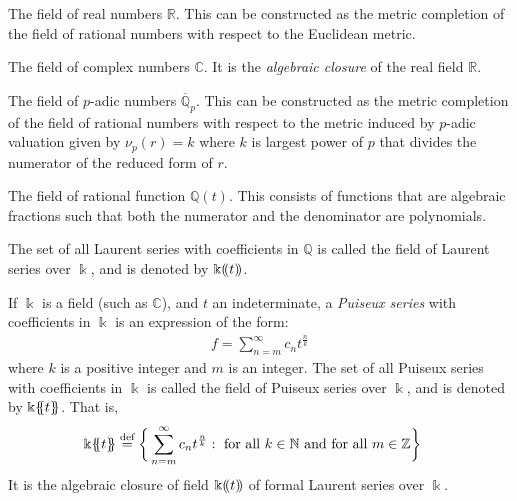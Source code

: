 \documentclass[a4paper, 12pt]{book} %
\begin{document}
\begin{example}
The field of real numbers $\mathbb{R}$. This can be constructed as the metric completion of the field of rational numbers with respect to the Euclidean metric.
\end{example}

\begin{example}
The field of complex numbers $\mathbb{C}$. It is the \emph{algebraic closure} of the real field $\mathbb{R}$.
\end{example}

\begin{example}
The field of $p$-adic numbers $\overline{\mathbb{Q}}_p$. This can be constructed as the metric completion of the field of rational numbers with respect to the metric induced by $p$-adic valuation given by $\nu_p(r) = k$ where $k$ is largest power of $p$ that divides the numerator of the reduced form of $r$. 
\end{example}

\begin{example}
The field of rational function $\mathbb{Q}(t)$. This consists of functions that are algebraic fractions such that both the numerator and the denominator are polynomials. 
\end{example}
    
\begin{example}
The set of all Laurent series with coefficients in $\mathbb{Q}$ is called the field of Laurent series over $\Bbbk$, and is denoted by $\Bbbk(\kern-.2em(t)\kern-.2em)$.
\end{example}

\begin{example}
If $\Bbbk$ is a field (such as $\mathbb{C}$), and $t$ an indeterminate, a \emph{Puiseux series} with coefficients in $\Bbbk$ is an expression of the form:
\begin{align}
    f = \sum_{n=m}^{\infty} c_n t^{ \frac{n}{k} }
\end{align}
where $k$ is a positive integer and $m$ is an integer. The set of all Puiseux series with coefficients in $\Bbbk$ is called the field of Puiseux series over $\Bbbk$, and is denoted by $\Bbbk\{\kern-.3em\{t\}\kern-.3em\}$. That is,
\begin{align}
    \Bbbk\{\kern-.3em\{t\}\kern-.3em\} &\overset{\text{def}}{=} \bigg\{ \sum_{n=m}^{\infty} c_n t^{ \frac{n}{k} }: ~\text{for all}~ k \in \mathbb{N}~\text{and for all}~ m \in \mathbb{Z} \bigg\}
\end{align}
It is the algebraic closure of field $\Bbbk(\kern-.2em(t)\kern-.2em)$ of formal Laurent series over $\Bbbk$.
\end{example}
\end{document}

